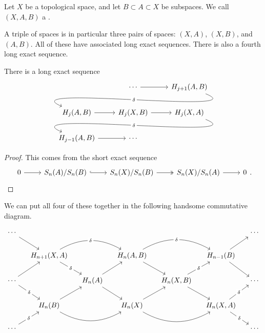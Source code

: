 \documentclass[main.tex]{subfiles}
\begin{document}
\begin{definition}
  \label{def:triple_of_spaces}
  Let $X$ be a topological space, and let $B \subset A \subset X$ be subspaces. We call $(X, A, B)$ a .
\end{definition}

A triple of spaces is in particular three pairs of spaces: $(X, A)$, $(X, B)$, and $(A, B)$. All of these have associated long exact sequences. There is also a fourth long exact sequence.

\begin{proposition}
  There is a long exact sequence
  \begin{equation*}
    \begin{tikzcd}
      & \cdots
      \arrow[r]
      & H_{j+1}(A, B)
      \\
      H_{j}(A, B)
      \arrow[from=urr, out=-22, in=157, looseness=1, overlay, "\delta" description]
      \arrow[r,]
      & H_{j}(X, B)
      \arrow[r,]
      & H_{j}(X, A)
      \\
      H_{j-1}(A, B)
      \arrow[r]
      \arrow[from=urr, out=-22, in=157, looseness=1, overlay, "\delta" description]
      & \cdots
    \end{tikzcd}
  \end{equation*}
\end{proposition}
\begin{proof}
  This comes from the short exact sequence
  \begin{equation*}
    \begin{tikzcd}
      0
      \arrow[r]
      & S_{n}(A)/S_{n}(B)
      \arrow[r, hook]
      & S_{n}(X)/S_{n}(B)
      \arrow[r, two heads]
      & S_{n}(X)/S_{n}(A)
      \arrow[r]
      & 0
    \end{tikzcd}.
  \end{equation*}
\end{proof}

We can put all four of these together in the following handsome commutative diagram.

\begin{equation*}
  \begin{tikzcd}[column sep=small]
    \cdots
    \arrow[dr]
    &&&&&& \cdots
    \\
    & H_{n+1}(X, A)
    \arrow[rr, bend left, overlay, "\delta" description]
    \arrow[dr, "\delta" description]
    && H_{n}(A, B)
    \arrow[rr, bend left, overlay, "\delta" description]
    \arrow[dr]
    && H_{n-1}(B)
    \arrow[ur]
    \arrow[dr]
    \\
    \cdots
    \arrow[ur]
    \arrow[dr, "\delta" description]
    && H_{n}(A)
    \arrow[ur]
    \arrow[dr]
    && H_{n}(X, B)
    \arrow[ur, "\delta" description]
    \arrow[dr]
    && \cdots
    \\
    & H_{n}(B)
    \arrow[rr, bend right]
    \arrow[ur]
    && H_{n}(X)
    \arrow[rr, bend right]
    \arrow[ur]
    && H_{n}(X, A)
    \arrow[ur, "\delta" description]
    \arrow[dr, "\delta" description]
    \\
    \cdots
    \arrow[ur, "\delta" description]
    &&&&&& \cdots
  \end{tikzcd}
\end{equation*}
\end{document}
